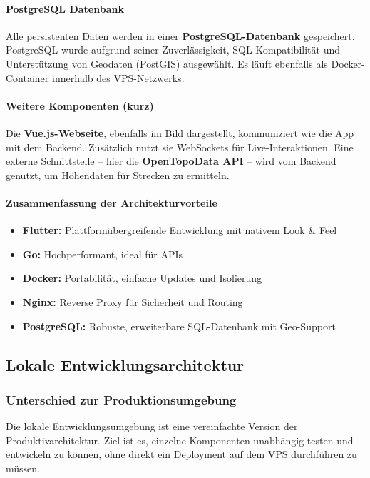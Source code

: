\documentclass[11pt,a4paper]{article}
\begin{document}
\paragraph{PostgreSQL Datenbank}
Alle persistenten Daten werden in einer \textbf{PostgreSQL-Datenbank} gespeichert. PostgreSQL wurde aufgrund seiner Zuverlässigkeit, SQL-Kompatibilität und Unterstützung von Geodaten (PostGIS) ausgewählt. Es läuft ebenfalls als Docker-Container innerhalb des VPS-Netzwerks.

\paragraph{Weitere Komponenten (kurz)}
Die \textbf{Vue.js-Webseite}\cite{vuejs}, ebenfalls im Bild dargestellt, kommuniziert wie die App mit dem Backend. Zusätzlich nutzt sie WebSockets für Live-Interaktionen. Eine externe Schnittstelle – hier die \textbf{OpenTopoData API}\cite{open_topo_data} – wird vom Backend genutzt, um Höhendaten für Strecken zu ermitteln.

\paragraph{Zusammenfassung der Architekturvorteile}
\begin{itemize}
    \item \textbf{Flutter:} Plattformübergreifende Entwicklung mit nativem Look \& Feel
    \item \textbf{Go:} Hochperformant, ideal für APIs
    \item \textbf{Docker:} Portabilität, einfache Updates und Isolierung
    \item \textbf{Nginx:} Reverse Proxy für Sicherheit und Routing
    \item \textbf{PostgreSQL:} Robuste, erweiterbare SQL-Datenbank mit Geo-Support
\end{itemize}

\subsection{Lokale Entwicklungsarchitektur}
\label{sec:lokale-entwicklung}

\subsubsection{Unterschied zur Produktionsumgebung}

Die lokale Entwicklungsumgebung ist eine vereinfachte Version der Produktivarchitektur. Ziel ist es, einzelne Komponenten unabhängig testen und entwickeln zu können, ohne direkt ein Deployment auf dem VPS durchführen zu müssen.
\end{document}
